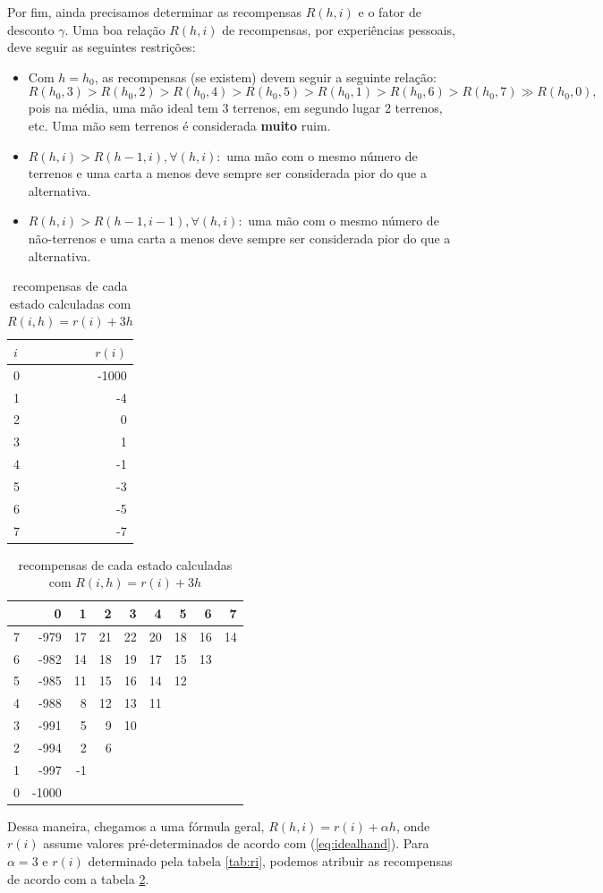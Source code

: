 \documentclass{book}
\begin{document}
Por fim, ainda precisamos determinar as recompensas $R(h, i)$ e o fator
de desconto $\gamma$.
Uma boa relação $R(h,i)$ de recompensas, por experiências pessoais, deve
seguir as seguintes restrições:
\begin{itemize}
  \item Com $h = h_0$, as recompensas (se existem) devem seguir a
seguinte relação:
  \begin{equation} \label{eq:idealhand}R(h_0, 3) > R(h_0, 2) > R(h_0, 4)
> R(h_0, 5) > R(h_0, 1) > R(h_0, 6) > R(h_0, 7) \gg R(h_0,
0),\end{equation}
  pois na média, uma mão ideal tem 3 terrenos, em segundo lugar 2
terrenos, etc. Uma mão sem terrenos é considerada \textbf{muito} ruim.
  \item $R(h, i) > R(h - 1, i), \forall (h, i):$ uma mão com o mesmo
número de terrenos e uma carta a menos deve sempre ser considerada pior
do que a alternativa.
  \item $R(h, i) > R(h - 1, i - 1), \forall (h, i):$ uma mão com o mesmo
número de não-terrenos e uma carta a menos deve sempre ser considerada
pior do que a alternativa.
\end{itemize}

\begin{table}[!b]
\parbox{.45\linewidth}{
\centering
\vspace{0.2cm}
\begin{tabular}{l|r}
$i$  & $r(i)$ \\ \hline
0 & -1000  \\
1 & -4     \\
2 & 0      \\
3 & 1      \\
4 & -1     \\
5 & -3     \\
6 & -5     \\
7 & -7
\end{tabular}
\caption{recompensas-base para $i = 0, \ldots, 7$}
\label{tab:ri}
}
\hfill
\parbox{.45\linewidth}{
\centering
\begin{tabular}{l|rrrrrrrr}
 & 0     & 1  & 2  & 3  & 4  & 5  & 6  & 7  \\ \hline
7 & -979  & 17 & 21 & 22 & 20 & 18 & 16 & 14 \\
6 & -982  & 14 & 18 & 19 & 17 & 15 & 13 &    \\
5 & -985  & 11 & 15 & 16 & 14 & 12 &    &    \\
4 & -988  & 8  & 12 & 13 & 11 &    &    &    \\
3 & -991  & 5  & 9  & 10 &    &    &    &    \\
2 & -994  & 2  & 6  &    &    &    &    &    \\
1 & -997  & -1 &    &    &    &    &    &    \\
0 & -1000 &    &    &    &    &    &    &
\end{tabular}
\caption{recompensas de cada estado calculadas com $R(i,h) = r(i) + 3h$}
\label{tab:Rhi}
}
\end{table}

Dessa maneira, chegamos a uma fórmula geral, $R(h, i) = r(i) + \alpha
h$, onde $r(i)$ assume valores pré-determinados de acordo com
(\ref{eq:idealhand}). Para $\alpha = 3$ e $r(i)$ determinado pela tabela
\ref{tab:ri}, podemos atribuir as recompensas de acordo com a tabela
\ref{tab:Rhi}.
\end{document}
